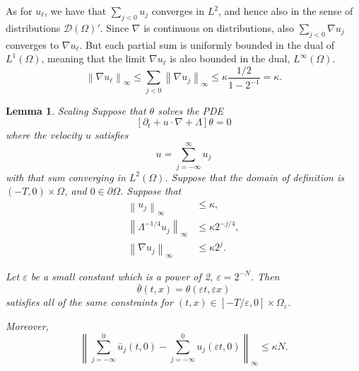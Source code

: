 \documentclass[11pt]{amsart}
\newtheorem{lemma}[theorem]{Lemma}
\theoremstyle{remark}
\newcommand{\eps}{\varepsilon}
\newcommand{\norm}[1]{\left\lVert#1\right\rVert}
\newcommand{\bracket}[1]{\left[ #1 \right]}
\newcommand{\del}{\partial}
\newcommand{\grad}{\nabla}
\newcommand{\test}{\mathcal{D}}
\begin{document}
As for $u_\ell$, we have that $\sum_{j < 0} u_j$ converges in $L^2$, and hence also in the sense of distributions $\test(\Omega)'$.  Since $\grad$ is continuous on distributions, also $\sum_{j<0} \grad u_j$ converges to $\grad u_\ell$.  But each partial sum is uniformly bounded in the dual of $L^1(\Omega)$, meaning that the limit $\grad u_\ell$ is also bounded in the dual, $L^\infty(\Omega)$.  
\[ \norm{\grad u_\ell}_\infty \leq \sum_{j < 0} \norm{\grad u_j}_\infty \leq \kappa \frac{1/2}{1 - 2^{-1}} = \kappa. \]

\begin{lemma}{Scaling}
Suppose that $\theta$ solves the PDE
\[ \bracket{\del_t + u\cdot\grad + \Lambda} \theta = 0\]
where the velocity $u$ satisfies
\[ u = \sum_{j=-\infty}^\infty u_j \]
with that sum converging in $L^2(\Omega)$.  Suppose that the domain of definition is $(-T,0) \times \Omega$, and $0 \in \del \Omega$.  Suppose that
\begin{align*}
\norm{u_j}_\infty &\leq \kappa, \\
\norm{\Lambda^{-1/4} u_j}_\infty &\leq \kappa 2^{-j/4}, \\
\norm{\grad u_j}_\infty &\leq \kappa 2^j.
\end{align*}

Let $\eps$ be a small constant which is a power of 2, $\eps = 2^{-N}$. Then
\[ \bar{\theta}(t,x) = \theta(\eps t, \eps x) \]
satisfies all of the same constraints for $(t,x) \in [-T/\eps, 0]\times \Omega_\eps$.  

Moreover, 
\[ \norm{\sum_{j=-\infty}^0 \bar{u}_j(t,0) - \sum_{j=-\infty}^0 u_j(\eps t, 0)}_\infty \leq \kappa N. \]
\end{lemma}
\end{document}
